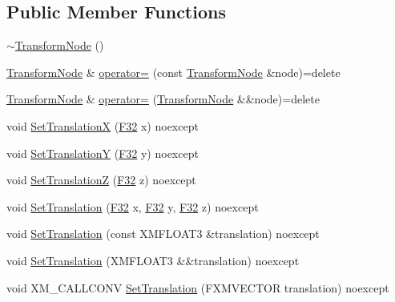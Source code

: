 \subsection*{Public Member Functions}
\begin{DoxyCompactItemize}
\item 
\hyperlink{structmage_1_1_transform_node_a0c5e84d99c27cda31dae8106611d682f}{$\sim$\+Transform\+Node} ()
\item 
\hyperlink{structmage_1_1_transform_node}{Transform\+Node} \& \hyperlink{structmage_1_1_transform_node_afd5f7d7b377b1a85cbe1d64f8f0df49a}{operator=} (const \hyperlink{structmage_1_1_transform_node}{Transform\+Node} \&node)=delete
\item 
\hyperlink{structmage_1_1_transform_node}{Transform\+Node} \& \hyperlink{structmage_1_1_transform_node_a8dcd5a36ad95917216df628d309b294d}{operator=} (\hyperlink{structmage_1_1_transform_node}{Transform\+Node} \&\&node)=delete
\item 
void \hyperlink{structmage_1_1_transform_node_a68710665ddc9fcba38840bd51c85b3e6}{Set\+TranslationX} (\hyperlink{namespacemage_aa97e833b45f06d60a0a9c4fc22ae02c0}{F32} x) noexcept
\item 
void \hyperlink{structmage_1_1_transform_node_a95f1b55e153664196d76d0664674569e}{Set\+TranslationY} (\hyperlink{namespacemage_aa97e833b45f06d60a0a9c4fc22ae02c0}{F32} y) noexcept
\item 
void \hyperlink{structmage_1_1_transform_node_abfdab39fb0ae4dd14ee7e340fa622693}{Set\+TranslationZ} (\hyperlink{namespacemage_aa97e833b45f06d60a0a9c4fc22ae02c0}{F32} z) noexcept
\item 
void \hyperlink{structmage_1_1_transform_node_a9e6f9e70a52dae0dacaac15ccff42302}{Set\+Translation} (\hyperlink{namespacemage_aa97e833b45f06d60a0a9c4fc22ae02c0}{F32} x, \hyperlink{namespacemage_aa97e833b45f06d60a0a9c4fc22ae02c0}{F32} y, \hyperlink{namespacemage_aa97e833b45f06d60a0a9c4fc22ae02c0}{F32} z) noexcept
\item 
void \hyperlink{structmage_1_1_transform_node_ae418bb44c86394c1590c7c6d6735027a}{Set\+Translation} (const X\+M\+F\+L\+O\+A\+T3 \&translation) noexcept
\item 
void \hyperlink{structmage_1_1_transform_node_af62e3d540778f236ba7b2fd914d369a6}{Set\+Translation} (X\+M\+F\+L\+O\+A\+T3 \&\&translation) noexcept
\item 
void X\+M\+\_\+\+C\+A\+L\+L\+C\+O\+NV \hyperlink{structmage_1_1_transform_node_a958f614a6a534d26ac1d3eab3bea5ccb}{Set\+Translation} (F\+X\+M\+V\+E\+C\+T\+OR translation) noexcept

\end{DoxyCompactItemize}
